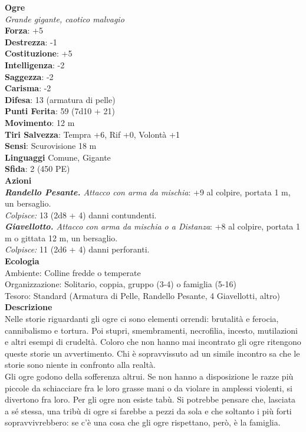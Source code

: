 \begin{multicols}{2}
\medskip\textbf{Ogre}\\
\emph{Grande gigante, caotico malvagio}\\
\textbf{Forza}: +5\\
\textbf{Destrezza}: -1\\
\textbf{Costituzione}: +5\\
\textbf{Intelligenza}: -2\\
\textbf{Saggezza}: -2\\
\textbf{Carisma}: -2\\
\textbf{Difesa}: 13 (armatura di pelle)\\
\textbf{Punti Ferita}: 59 (7d10 + 21)\\
\textbf{Movimento}: 12 m\\
\textbf{Tiri Salvezza}: Tempra +6, Rif +0, Volontà +1\\
\textbf{Sensi}: Scurovisione 18 m\\
\textbf{Linguaggi} Comune, Gigante\\
\textbf{Sfida}: 2 (450 PE)\smallskip\\
\smallskip\textbf{Azioni}\\
\emph{\textbf{Randello Pesante.} Attacco con arma da mischia}: +9 al colpire, portata 1 m, un bersaglio.\\
\emph{Colpisce:} 13 (2d8 + 4) danni contundenti.\\
\emph{\textbf{Giavellotto.} Attacco con arma da mischia o a Distanza}: +8 al colpire, portata 1 m o gittata 12 m, un bersaglio.\\
\emph{Colpisce:} 11 (2d6 + 4) danni perforanti.\\
\textbf{Ecologia}\\
Ambiente: Colline fredde o temperate\\
Organizzazione: Solitario, coppia, gruppo (3-4) o famiglia (5-16)\\
Tesoro: Standard (Armatura di Pelle, Randello Pesante, 4 Giavellotti, altro)\\
\textbf{Descrizione}\\
Nelle storie riguardanti gli ogre ci sono elementi orrendi: brutalità e ferocia, cannibalismo e tortura. Poi stupri, smembramenti, necrofilia, incesto, mutilazioni e altri esempi di crudeltà. Coloro che non hanno mai incontrato gli ogre ritengono queste storie un avvertimento. Chi è sopravvissuto ad un simile incontro sa che le storie sono niente in confronto alla realtà.\\

Gli ogre godono della sofferenza altrui. Se non hanno a disposizione le razze più piccole da schiacciare fra le loro grasse mani o da violare in amplessi violenti, si divertono fra loro. Per gli ogre non esiste tabù. Si potrebbe pensare che, lasciata a sé stessa, una tribù di ogre si farebbe a pezzi da sola e che soltanto i più forti sopravvivrebbero: se c’è una cosa che gli ogre rispettano, però, è la famiglia.\\


\end{multicols}
